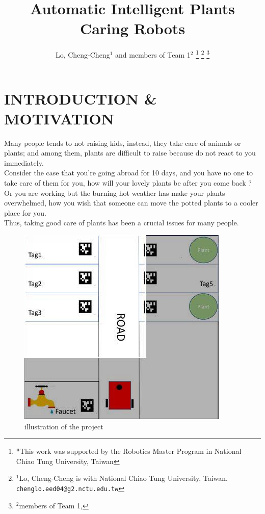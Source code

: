 \documentclass[a4paper, 10pt, conference]{ieeeconf}      %
\title{\LARGE \bf
Automatic Intelligent Plants Caring Robots
}
\author{Lo, Cheng-Cheng$^{1}$ and members of Team 1$^{2}$%
\thanks{*This work was supported by the Robotics Master Program in National Chiao Tung University, Taiwan}%
\thanks{$^{1}$Lo, Cheng-Cheng is with National Chiao Tung University, Taiwan. 
        {\tt\small chenglo.eed04@g2.nctu.edu.tw}}%
\thanks{$^{2}$members of Team 1,
        {\tt\small}}%
}
\begin{document}
\maketitle
\thispagestyle{empty}
\pagestyle{empty}


\section{INTRODUCTION \& MOTIVATION}

\hspace*{4mm} Many people tends to not raising kids, instead, they take care of animals or plants; and among them, plants are difficult to raise because do not react to you immediately.\\
\hspace*{4mm}Consider the case that you're going abroad for 10 days, and you have no one to take care of them for you, how will your lovely plants be after you come back ?  Or you are working but the burning hot weather has make your plants overwhelmed, how you wish that someone can move the potted plants to a cooler place for you.\\
\hspace*{4mm}Thus, taking good care of plants has been a crucial issues for many people.\\

\begin{figure}[htbp] %
\includegraphics[width=0.8\columnwidth]{23602259_1745798205444844_1157434552_n.jpg}
\centering
\caption{illustration of the project}
\end{figure}
\end{document}
